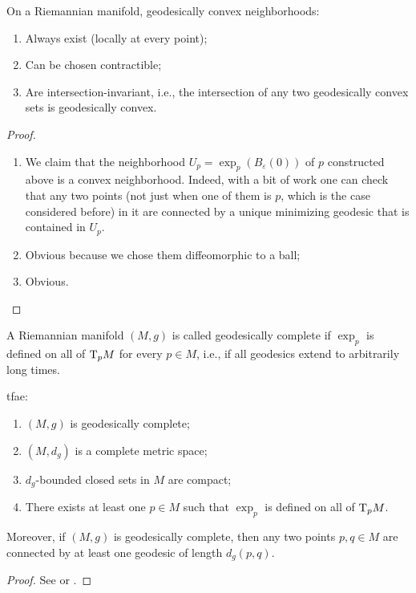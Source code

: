 \begin{thm}\label{geodesically convex nbhds thm}
    On a Riemannian manifold, geodesically convex neighborhoods:
    \begin{enumerate}
        \item Always exist (locally at every point);
        \item Can be chosen contractible;
        \item Are intersection-invariant, i.e., the intersection of any two geodesically convex sets is geodesically convex.
    \end{enumerate}
\end{thm}
\begin{proof}
    \begin{enumerate}
        \item We claim that the neighborhood $U_p=\exp_p(B_\varepsilon(0))$ of $p$ constructed above is a convex neighborhood. Indeed, with a bit of work one can check that any two points (not just when one of them is $p$, which is the case considered before) in it are connected by a unique minimizing geodesic that is contained in $U_p$.
        \item Obvious because we chose them diffeomorphic to a ball;
        \item Obvious.
    \end{enumerate}
\end{proof}


\begin{defn}
    A Riemannian manifold $(M,g)$ is called geodesically complete if $\exp_p$ is defined on all of $\mathrm{T}_pM$ for every $p\in M$, i.e., if all geodesics extend to arbitrarily long times.
\end{defn}

\begin{thm}
    \gls{tfae}:
    \begin{enumerate}
        \item $(M,g)$ is geodesically complete;
        \item $(M,d_g)$ is a complete metric space;
        \item $d_g$-bounded closed sets in $M$ are compact;
        \item There exists at least one $p\in M$ such that $\exp_p$ is defined on all of $\mathrm{T}_p M$.
    \end{enumerate}
    Moreover, if $(M,g)$ is geodesically complete, then any two points $p,q\in M$ are connected by at least one geodesic of length $d_g(p,q)$.
\end{thm}
\begin{proof}
    See \cite[Thm. 1.7.1]{Jost} or \cite[Thm. 10.9]{Milnor}.
\end{proof}



